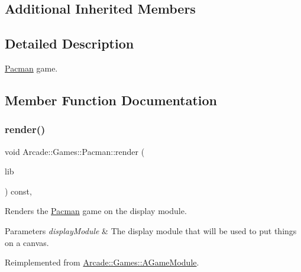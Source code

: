 \subsection*{Additional Inherited Members}


\subsection{Detailed Description}
\mbox{\hyperlink{classArcade_1_1Games_1_1Pacman}{Pacman}} game. 

\subsection{Member Function Documentation}
\mbox{\label{classArcade_1_1Games_1_1Pacman_ab1a7408f265efbef12b4f9d1a6fb4512}} 
\subsubsection{\texorpdfstring{render()}{render()}}
{\footnotesize\ttfamily void Arcade\+::\+Games\+::\+Pacman\+::render (\begin{DoxyParamCaption}\item[{\mbox{\hyperlink{classArcade_1_1Display_1_1IDisplayModule}{Arcade\+::\+Display\+::\+I\+Display\+Module}} \&}]{lib }\end{DoxyParamCaption}) const\hspace{0.3cm}{\ttfamily [final]}, {\ttfamily [virtual]}}



Renders the \mbox{\hyperlink{classArcade_1_1Games_1_1Pacman}{Pacman}} game on the display module. 


\begin{DoxyParams}{Parameters}
{\em display\+Module} & The display module that will be used to put things on a canvas. \\
\hline
\end{DoxyParams}


Reimplemented from \mbox{\hyperlink{classArcade_1_1Games_1_1AGameModule_a5897780d42d5faba3287c29b87f2b498}{Arcade\+::\+Games\+::\+A\+Game\+Module}}.

\mbox{\label{classArcade_1_1Games_1_1Pacman_aa6bc227c3f14cc8d66d11f2d32bed3ec}} 
